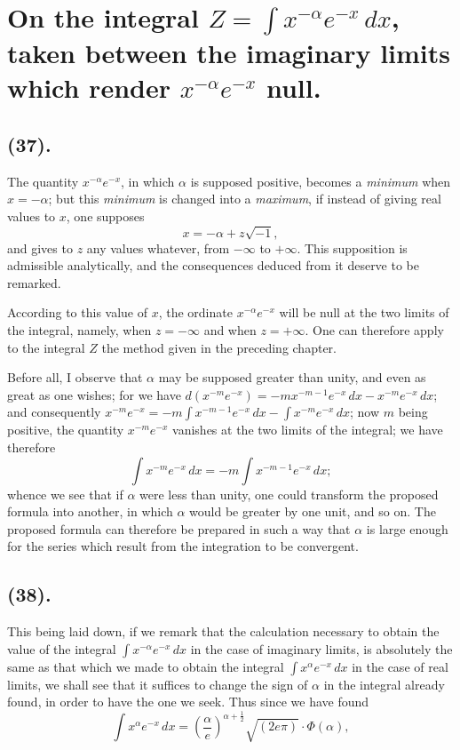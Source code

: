 \documentclass{article}
\begin{document}
\section*{On the integral $Z=\displaystyle\int x^{-\alpha}e^{-x}\,dx$, taken between the imaginary limits which render $x^{-\alpha}e^{-x}$ null.}

\subsection*{(37).}

The quantity $x^{-\alpha}e^{-x}$, in which $\alpha$ is supposed positive, becomes a \emph{minimum} when $x=-\alpha$; but this \emph{minimum} is changed into a \emph{maximum}, if instead of giving real values to $x$, one supposes
\[ x=-\alpha+z\sqrt{-1}, \]
and gives to $z$ any values whatever, from $-\infty$ to $+\infty$. This supposition is admissible analytically, and the consequences deduced from it deserve to be remarked.

According to this value of $x$, the ordinate $x^{-\alpha}e^{-x}$ will be null at the two limits of the integral, namely, when $z=-\infty$ and when $z=+\infty$. One can therefore apply to the integral $Z$ the method given in the preceding chapter.

Before all, I observe that $\alpha$ may be supposed greater than unity, and even as great as one wishes; for we have $d(x^{-m}e^{-x})=-mx^{-m-1}e^{-x}\,dx-x^{-m}e^{-x}\,dx$; and consequently $x^{-m}e^{-x}=-m\displaystyle\int x^{-m-1}e^{-x}\,dx-\displaystyle\int x^{-m}e^{-x}\,dx$; now $m$ being positive, the quantity $x^{-m}e^{-x}$ vanishes at the two limits of the integral; we have therefore
\[ \int x^{-m}e^{-x}\,dx=-m\int x^{-m-1}e^{-x}\,dx; \]
whence we see that if $\alpha$ were less than unity, one could transform the proposed formula into another, in which $\alpha$ would be greater by one unit, and so on. The proposed formula can therefore be prepared in such a way that $\alpha$ is large enough for the series which result from the integration to be convergent.

\subsection*{(38).}

This being laid down, if we remark that the calculation necessary to obtain the value of the integral $\displaystyle\int x^{-\alpha}e^{-x}\,dx$ in the case of imaginary limits, is absolutely the same as that which we made to obtain the integral $\displaystyle\int x^{\alpha}e^{-x}\,dx$ in the case of real limits, we shall see that it suffices to change the sign of $\alpha$ in the integral already found, in order to have the one we seek. Thus since we have found
\[ \int x^{\alpha}e^{-x}\,dx=\left(\frac{\alpha}{e}\right)^{\alpha+\frac{1}{2}}\sqrt{(2e\pi)}\cdot\Phi(\alpha), \]
\end{document}
